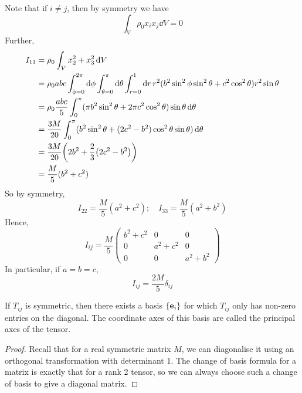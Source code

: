 Note that if \(i \neq j\), then by symmetry we have
\[
	\int_V \rho_0 x_i x_j \dd{V} = 0
\]
Further,
\begin{align*}
	I_{11} & = \rho_0 \int_V x_2^2 + x_3^2 \dd{V}                                                                                                                                  \\
	       & = \rho_0 abc \int_{\phi = 0}^{2\pi} \dd{\phi} \int_{\theta = 0}^\pi \dd{\theta} \int_{r = 0}^1 \dd{r} r^2 (b^2\sin^2\phi\sin^2\theta + c^2\cos^2\theta) r^2\sin\theta \\
	       & = \rho_0 \frac{abc}{5} \int_0^\pi (\pi b^2 \sin^2 \theta + 2\pi c^2\cos^2\theta) \sin\theta \dd{\theta}                                                               \\
	       & = \frac{3M}{20} \int_0^\pi (b^2 \sin^2 \theta + (2c^2 - b^2)\cos^2\theta\sin\theta) \dd{\theta}                                                                       \\
	       & = \frac{3M}{20} \qty(2b^2 + \frac{2}{3}\qty(2c^2 - b^2))                                                                                                              \\
	       & = \frac{M}{5} (b^2 + c^2)
\end{align*}
So by symmetry,
\[
	I_{22} = \frac{M}{5} (a^2 + c^2);\quad I_{33} = \frac{M}{5} (a^2 + b^2)
\]
Hence,
\[
	I_{ij} = \frac{M}{5} \begin{pmatrix}
		b^2 + c^2 & 0         & 0         \\
		0         & a^2 + c^2 & 0         \\
		0         & 0         & a^2 + b^2
	\end{pmatrix}
\]
In particular, if \(a=b=c\),
\[
	I_{ij} = \frac{2M}{5}\delta_{ij}
\]
\begin{proposition}
	If \(T_{ij}\) is symmetric, then there exists a basis \(\{ \vb e_i \}\) for which \(T_{ij}\) only has non-zero entries on the diagonal.
	The coordinate axes of this basis are called the principal axes of the tensor.
\end{proposition}
\begin{proof}
	Recall that for a real symmetric matrix \(M\), we can diagonalise it using an orthogonal transformation with determinant 1.
	The change of basis formula for a matrix is exactly that for a rank 2 tensor, so we can always choose such a change of basis to give a diagonal matrix.
\end{proof}
